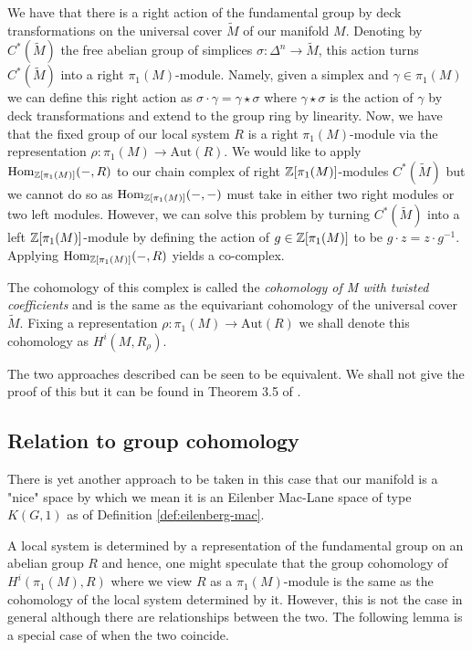 We have that there is a right action of the fundamental group by deck
transformations on the universal cover $\tilde{M}$ of our manifold $M$.
Denoting by $C^*(\tilde{M})$ the free abelian group of simplices $\sigma:
    \Delta^n \to \tilde{M}$, this action turns $C^*(\tilde{M})$ into a right
$\pi_1(M)$-module. Namely, given a simplex and $\gamma \in \pi_1(M)$ we can
define this right action as $\sigma \cdot \gamma = \gamma \star \sigma $ where
$\gamma \star \sigma $ is the action of $\gamma$ by deck transformations and
extend to the group ring by linearity. Now, we have that the fixed group of our
local system $R$ is a right $\pi_1(M)$-module via the representation $\rho:
    \pi_1(M) \to \text{Aut}(R)$. We would like to apply
$\text{Hom}_{\mathbb{Z}[\pi_1(M)]}(-,R)$ to our chain complex of right
$\mathbb{Z}[\pi_1(M)]$-modules $C^*(\tilde{M})$ but we cannot do so as
$\text{Hom}_{\mathbb{Z}[\pi_1(M)]}(-,-)$ must take in either two right modules or two
left modules. However, we can solve this problem by turning $C^*(\tilde{M})$
into a left $\mathbb{Z}[\pi_1(M)]$-module by defining the action of $g \in
    \mathbb{Z}[\pi_1(M)]$ to be $g \cdot z = z \cdot g^{-1}$. Applying
$\text{Hom}_{\mathbb{Z}[\pi_1(M)]}(-,R)$ yields a co-complex.

\begin{definition}\label{def:equivariant-coho}
    The cohomology of this complex is called the \emph{cohomology of M with twisted coefficients} and is
    the same as the equivariant cohomology of the universal cover $\tilde{M}$. Fixing a representation $\rho: \pi_1(M) \to \text{Aut}(R)$ we shall
    denote this cohomology as $H^i(M, R_{\rho})$.
\end{definition}

The two approaches described can be seen to be equivalent. We shall not give
the proof of this but it can be found in Theorem 3.5 of
\cite{whitehead1978elements}.

\subsection{Relation to group cohomology}
There is yet another approach to be taken in this case that our manifold is a
"nice" space by which we mean it is an Eilenber Mac-Lane space of type $K(G,1)$
as of Definition \ref{def:eilenberg-mac}.

A local system is determined by a representation of the fundamental group on an
abelian group $R$ and hence, one might speculate that the group cohomology of
$H^i(\pi_1(M) ,R)$ where we view $R$ as a $\pi_1(M)$-module is the same as the
cohomology of the local system determined by it. However, this is not the case
in general although there are relationships between the two. The following
lemma is a special case of when the two coincide.

